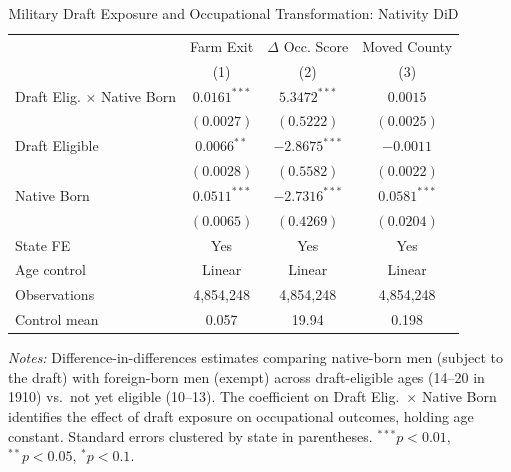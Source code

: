 \begin{table}[t]
\centering
\begin{threeparttable}
\caption{Military Draft Exposure and Occupational Transformation: Nativity DiD}
\label{tab:nativity_did}
\begin{tabular}{lccc}
\hline\hline
 & Farm Exit & $\Delta$ Occ. Score & Moved County \\
 & (1) & (2) & (3) \\
\hline
Draft Elig. $\times$ Native Born & $0.0161^{***}$ & $5.3472^{***}$ & $0.0015$ \\
 & $(0.0027)$ & $(0.5222)$ & $(0.0025)$ \\
Draft Eligible & $0.0066^{**}$ & $-2.8675^{***}$ & $-0.0011$ \\
 & $(0.0028)$ & $(0.5582)$ & $(0.0022)$ \\
Native Born & $0.0511^{***}$ & $-2.7316^{***}$ & $0.0581^{***}$ \\
 & $(0.0065)$ & $(0.4269)$ & $(0.0204)$ \\
\hline
State FE & Yes & Yes & Yes \\
Age control & Linear & Linear & Linear \\
Observations & 4,854,248 & 4,854,248 & 4,854,248 \\
Control mean & 0.057 & 19.94 & 0.198 \\
\hline\hline
\end{tabular}
\begin{tablenotes}[flushleft]\small
\item \textit{Notes:} Difference-in-differences estimates comparing native-born men (subject to the draft) with foreign-born men (exempt) across draft-eligible ages (14--20 in 1910) vs.\ not yet eligible (10--13). The coefficient on Draft Elig.\ $\times$ Native Born identifies the effect of draft exposure on occupational outcomes, holding age constant. Standard errors clustered by state in parentheses. $^{***}p<0.01$, $^{**}p<0.05$, $^{*}p<0.1$.
\end{tablenotes}
\end{threeparttable}
\end{table}

